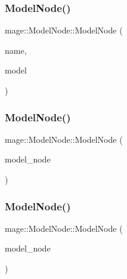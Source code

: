 \hypertarget{classmage_1_1_model_node_a15d6a41cc5cdc90310313147100c1d6f}{}\label{classmage_1_1_model_node_a15d6a41cc5cdc90310313147100c1d6f} 
\subsubsection{\texorpdfstring{Model\+Node()}{ModelNode()}\hspace{0.1cm}{\footnotesize\ttfamily [2/4]}}
{\footnotesize\ttfamily mage\+::\+Model\+Node\+::\+Model\+Node (\begin{DoxyParamCaption}\item[{const string \&}]{name,  }\item[{\hyperlink{namespacemage_a8c307fbcc33bce9b7f2aa4c26c3b95cf}{Unique\+Ptr}$<$ \hyperlink{classmage_1_1_model}{Model} $>$ \&\&}]{model }\end{DoxyParamCaption})\hspace{0.3cm}{\ttfamily [explicit]}}

\hypertarget{classmage_1_1_model_node_a409c098ddecf20d1b393d43c15d16482}{}\label{classmage_1_1_model_node_a409c098ddecf20d1b393d43c15d16482} 
\subsubsection{\texorpdfstring{Model\+Node()}{ModelNode()}\hspace{0.1cm}{\footnotesize\ttfamily [3/4]}}
{\footnotesize\ttfamily mage\+::\+Model\+Node\+::\+Model\+Node (\begin{DoxyParamCaption}\item[{const \hyperlink{classmage_1_1_model_node}{Model\+Node} \&}]{model\+\_\+node }\end{DoxyParamCaption})}

\hypertarget{classmage_1_1_model_node_a19ba577112ea488f227ea31642fb2cb2}{}\label{classmage_1_1_model_node_a19ba577112ea488f227ea31642fb2cb2} 
\subsubsection{\texorpdfstring{Model\+Node()}{ModelNode()}\hspace{0.1cm}{\footnotesize\ttfamily [4/4]}}
{\footnotesize\ttfamily mage\+::\+Model\+Node\+::\+Model\+Node (\begin{DoxyParamCaption}\item[{\hyperlink{classmage_1_1_model_node}{Model\+Node} \&\&}]{model\+\_\+node }\end{DoxyParamCaption})\hspace{0.3cm}{\ttfamily [default]}}

